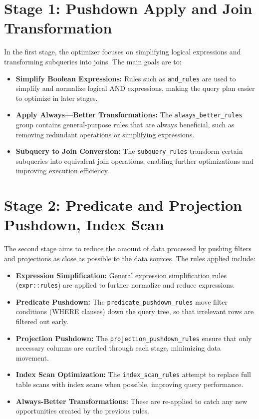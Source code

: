 \documentclass[a4paper,12pt]{scrreprt}
\begin{document}
\section{Stage 1: Pushdown Apply and Join Transformation}
In the first stage, the optimizer focuses on simplifying logical expressions and transforming subqueries into joins. The main goals are to:
\begin{itemize}
    \item \textbf{Simplify Boolean Expressions:} Rules such as \texttt{and\_rules} are used to simplify and normalize logical AND expressions, making the query plan easier to optimize in later stages.
    \item \textbf{Apply Always---Better Transformations:} The \texttt{always\_better\_rules} group contains general-purpose rules that are always beneficial, such as removing redundant operations or simplifying expressions.
    \item \textbf{Subquery to Join Conversion:} The \texttt{subquery\_rules} transform certain subqueries into equivalent join operations, enabling further optimizations and improving execution efficiency.
\end{itemize}

\section{Stage 2: Predicate and Projection Pushdown, Index Scan}
The second stage aims to reduce the amount of data processed by pushing filters and projections as close as possible to the data sources. The rules applied include:
\begin{itemize}
    \item \textbf{Expression Simplification:} General expression simplification rules (\texttt{expr::rules}) are applied to further normalize and reduce expressions.
    \item \textbf{Predicate Pushdown:} The \texttt{predicate\_pushdown\_rules} move filter conditions (WHERE clauses) down the query tree, so that irrelevant rows are filtered out early.
    \item \textbf{Projection Pushdown:} The \texttt{projection\_pushdown\_rules} ensure that only necessary columns are carried through each stage, minimizing data movement.
    \item \textbf{Index Scan Optimization:} The \texttt{index\_scan\_rules} attempt to replace full table scans with index scans when possible, improving query performance.
    \item \textbf{Always-Better Transformations:} These are re-applied to catch any new opportunities created by the previous rules.
\end{itemize}
\end{document}
